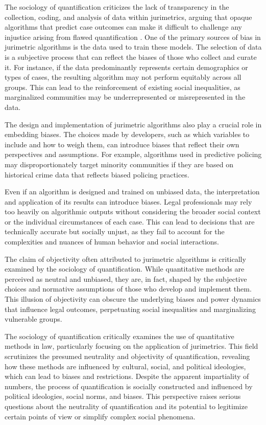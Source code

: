 The sociology of quantification criticizes the lack of transparency in the collection, coding, and analysis of data within jurimetrics, arguing that opaque algorithms that predict case outcomes can make it difficult to challenge any injustice arising from flawed quantification \cite{10.5040/9781350220645,10.1590/dados.2022.65.3.267}. One of the primary sources of bias in jurimetric algorithms is the data used to train these models. The selection of data is a subjective process that can reflect the biases of those who collect and curate it. For instance, if the data predominantly represents certain demographics or types of cases, the resulting algorithm may not perform equitably across all groups. This can lead to the reinforcement of existing social inequalities, as marginalized communities may be underrepresented or misrepresented in the data.

The design and implementation of jurimetric algorithms also play a crucial role in embedding biases. The choices made by developers, such as which variables to include and how to weigh them, can introduce biases that reflect their own perspectives and assumptions. For example, algorithms used in predictive policing may disproportionately target minority communities if they are based on historical crime data that reflects biased policing practices.

Even if an algorithm is designed and trained on unbiased data, the interpretation and application of its results can introduce biases. Legal professionals may rely too heavily on algorithmic outputs without considering the broader social context or the individual circumstances of each case. This can lead to decisions that are technically accurate but socially unjust, as they fail to account for the complexities and nuances of human behavior and social interactions.

The claim of objectivity often attributed to jurimetric algorithms is critically examined by the sociology of quantification. While quantitative methods are perceived as neutral and unbiased, they are, in fact, shaped by the subjective choices and normative assumptions of those who develop and implement them. This illusion of objectivity can obscure the underlying biases and power dynamics that influence legal outcomes, perpetuating social inequalities and marginalizing vulnerable groups.

The sociology of quantification critically examines the use of quantitative methods in law, particularly focusing on the application of jurimetrics. This field scrutinizes the presumed neutrality and objectivity of quantification, revealing how these methods are influenced by cultural, social, and political ideologies, which can lead to biases and restrictions. Despite the apparent impartiality of numbers, the process of quantification is socially constructed and influenced by political ideologies, social norms, and biases. This perspective raises serious questions about the neutrality of quantification and its potential to legitimize certain points of view or simplify complex social phenomena.

